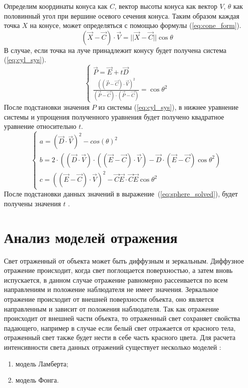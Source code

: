 Определим координаты конуса как $C$, вектор высоты конуса как вектор $V$, 
$\theta$ как половинный угол при вершине осевого сечения конуса. Таким образом
каждая точка $X$ на конусе, может определяться с помощью формулы (\ref{eq:cone_form}).
\begin{equation}
	(\vec{X} - \vec{C}) \cdot \vec{V} = ||\vec{X} - \vec{C}||\cos{\theta}
	\label{eq:cone_form}
\end{equation}
В случае, если точка на луче принадлежит конусу будет получена система (\ref{eq:cyl_sys}).
\begin{equation}
	\begin{cases}
		\vec{P} = \vec{E} + t\vec{D} \\
		\frac{((\vec{P} - \vec{C}) \cdot \vec{V})^{2}}{(\vec{P} - \vec{C}) \cdot (\vec{P} - \vec{C})} = {\cos{\theta}}^{2}
	\end{cases}
	\label{eq:cyl_sys}
\end{equation}
После подстановки значения $P$ из системы (\ref{eq:cyl_sys}), в нижнее уравнение системы и упрощения полученного уравнения будет получено квадратное уравнение относительно $t$.
\begin{equation}
	\begin{cases}
	a = (\vec{D} \cdot \vec{V})^{2} - cos(\theta)^{2} \\
	b = 2 \cdot ((\vec{D} \cdot \vec{V}) \cdot ((\vec{E} - \vec{C}) \cdot \vec{V}) - \vec{D} \cdot (\vec{E} - \vec{C}){\cos{\theta}}^{2}) \\
	
	c = ((\vec{E} - \vec{C}) \cdot \vec{V})^{2} - \vec{C}\vec{E} \cdot \vec{C}\vec{E}\cos{\theta}^{2}
	\end{cases}
\end{equation}
После подстановки данных значений в выражение~(\ref{eq:sphere_solved}), будет получены значения $t$ \cite{cone_inter}.



\section{Анализ моделей отражения}
\label{sec:reflection_models}
Свет отраженный от объекта может быть диффузным и зеркальным.
Диффузное отражение происходит, когда свет поглощается поверхностью, а затем вновь испускается, в данном случае
отражение равномерно рассеивается по всем направлениям и положение наблюдателя не имеет значения. Зеркальное отражение
происходит от внешней поверхности объекта, оно является направленным и зависит от положения наблюдателя.
Так как отражение происходит от внешней части объекта, то отраженный свет сохраняет свойства падающего, например в случае если белый свет отражается
от красного тела, отраженный свет также будет нести в себе часть красного цвета.
Для расчета интенсивности света данных отражений существует несколько моделей \cite{Rodgers}:
\begin{enumerate}
	\item модель Ламберта;
	\item модель Фонга.
\end{enumerate}

